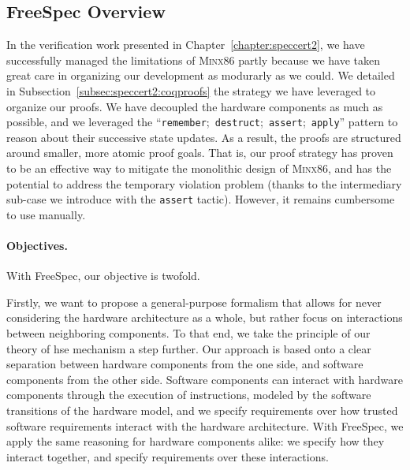 \subsection{FreeSpec Overview}
\label{freespec:subsec:freespecoverview}

In the verification work presented in Chapter~\ref{chapter:speccert2}, we have
successfully managed the limitations of {\scshape Minx86} partly because we have
taken great care in organizing our development as modurarly as we could.
%
We detailed in Subsection~\ref{subsec:speccert2:coqproofs} the strategy we have
leveraged to organize our proofs.
%
We have decoupled the hardware components as much as possible, and we leveraged
the ``\texttt{remember};~\texttt{destruct};~\texttt{assert};~\texttt{apply}''
pattern to reason about their successive state updates.
%
As a result, the proofs are structured around smaller, more atomic proof goals.
%
That is, our proof strategy has proven to be an effective way to mitigate the
monolithic design of {\scshape Minx86}, and has the potential to address the
temporary violation problem (thanks to the intermediary sub-case we introduce
with the \texttt{assert} tactic).
%
However, it remains cumbersome to use manually.


\paragraph{Objectives.}
%
With FreeSpec, our objective is twofold.

Firstly, we want to propose a general-purpose formalism that allows for never
considering the hardware architecture as a whole, but rather focus on
interactions between neighboring components.
%
To that end, we take the principle of our theory of \ac{hse} mechanism a step
further.
%
Our approach is based onto a clear separation between hardware components from
the one side, and software components from the other side.
%
Software components can interact with hardware components through the execution
of instructions, modeled by the software transitions of the hardware model, and
we specify requirements over how trusted software requirements interact with the
hardware architecture.
%
With FreeSpec, we apply the same reasoning for hardware components alike: we
specify how they interact together, and specify requirements over these
interactions.

